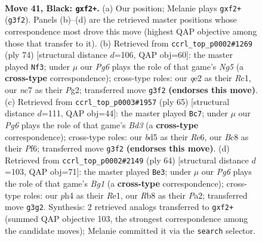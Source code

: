 \documentclass[11pt]{article}
\begin{document}
\clearpage

\begin{figure}[p]\centering
\begin{subfigure}{0.46\textwidth}\centering
\resizebox{\linewidth}{!}{%
\newchessgame
\chessboard[
  setfen={1rb2r2/p1N2p1k/1p3Bp1/2qB4/7P/1P4p1/R1PNQP2/R5K1 b - - 0 41},
  showmover=false,
  pgfstyle=straightmove, color=movearrow, markmove={g3-f2}
]}
\caption{}
\end{subfigure}\hfill
\begin{subfigure}{0.46\textwidth}\centering
\resizebox{\linewidth}{!}{%
\newchessgame
\chessboard[
  setfen={4r3/2pbr1kp/pq1p1p2/6N1/Pp2P1n1/1P1B2R1/1Q3PP1/2R3K1 w - - 3 38},
  showmover=false,
  pgfstyle=straightmove, color=movearrow, markmove={g5-f3}
]}
\caption{}
\end{subfigure}
\\[4pt]
\begin{subfigure}{0.46\textwidth}\centering
\resizebox{\linewidth}{!}{%
\newchessgame
\chessboard[
  setfen={4r3/6k1/p1qbrpp1/1pP4p/8/PQ1RB2P/5PP1/2R3K1 b - - 5 33},
  showmover=false,
  pgfstyle=straightmove, color=movearrow, markmove={d6-c7}
]}
\caption{}
\end{subfigure}\hfill
\begin{subfigure}{0.46\textwidth}\centering
\resizebox{\linewidth}{!}{%
\newchessgame
\chessboard[
  setfen={2br4/2p3qk/p1Q2b1p/3n4/1p6/3P4/PPP3PP/1K2RRB1 w - - 1 33},
  showmover=false,
  pgfstyle=straightmove, color=movearrow, markmove={g1-e3}
]}
\caption{}
\end{subfigure}
\caption{\textbf{Move 41, Black: \texttt{gxf2+}.} (a) Our position; Melanie plays \texttt{gxf2+} (\texttt{g3f2}). Panels (b)--(d) are the retrieved master positions whose correspondence most drove this move (highest QAP objective among those that transfer to it). (b) Retrieved from \texttt{ccrl\_top\_p0002\#1269} (ply 74) [structural distance $d$=106, QAP obj=60]: the master played \texttt{Nf3}; under $\mu$ our \emph{Pg6} plays the role of that game's \emph{Ng5} (a \textbf{cross-type} correspondence); cross-type roles: our \emph{q}e2 as their \emph{R}c1, our \emph{n}c7 as their \emph{P}g2; transferred move \texttt{g3f2} \textbf{(endorses this move)}. (c) Retrieved from \texttt{ccrl\_top\_p0003\#1957} (ply 65) [structural distance $d$=111, QAP obj=44]: the master played \texttt{Bc7}; under $\mu$ our \emph{Pg6} plays the role of that game's \emph{Bd3} (a \textbf{cross-type} correspondence); cross-type roles: our \emph{b}d5 as their \emph{R}e6, our \emph{B}c8 as their \emph{P}f6; transferred move \texttt{g3f2} \textbf{(endorses this move)}. (d) Retrieved from \texttt{ccrl\_top\_p0002\#2149} (ply 64) [structural distance $d$=103, QAP obj=71]: the master played \texttt{Be3}; under $\mu$ our \emph{Pg6} plays the role of that game's \emph{Bg1} (a \textbf{cross-type} correspondence); cross-type roles: our \emph{p}h4 as their \emph{R}e1, our \emph{R}b8 as their \emph{P}a2; transferred move \texttt{g3g2}. Synthesis: 2 retrieved analogs transferred to \texttt{gxf2+} (summed QAP objective 103, the strongest correspondence among the candidate moves); Melanie committed it via the \texttt{search} selector.}
\label{fig:thought-m81}
\end{figure}
\end{document}
